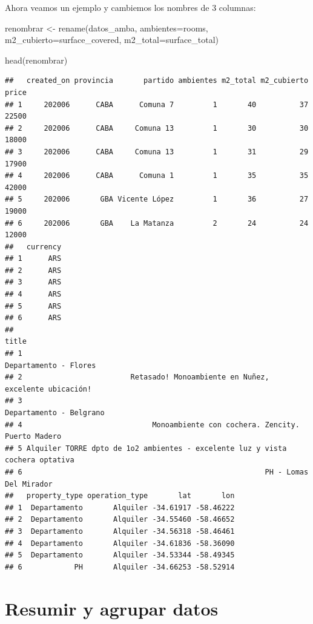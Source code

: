 \documentclass[
  spanish,
]{book}
\newenvironment{Shaded}{\begin{snugshade}}{\end{snugshade}}
\newcommand{\AttributeTok}[1]{\textcolor[rgb]{0.77,0.63,0.00}{#1}}
\newcommand{\FunctionTok}[1]{\textcolor[rgb]{0.00,0.00,0.00}{#1}}
\newcommand{\NormalTok}[1]{#1}
\newcommand{\OtherTok}[1]{\textcolor[rgb]{0.56,0.35,0.01}{#1}}
\begin{document}
Ahora veamos un ejemplo y cambiemos los nombres de 3 columnas:

\begin{Shaded}
\begin{Highlighting}[]
\NormalTok{renombrar }\OtherTok{\textless{}{-}} \FunctionTok{rename}\NormalTok{(datos\_amba, }\AttributeTok{ambientes=}\NormalTok{rooms, }\AttributeTok{m2\_cubierto=}\NormalTok{surface\_covered, }\AttributeTok{m2\_total=}\NormalTok{surface\_total)}

\FunctionTok{head}\NormalTok{(renombrar)}
\end{Highlighting}
\end{Shaded}

\begin{verbatim}
##   created_on provincia       partido ambientes m2_total m2_cubierto price
## 1     202006      CABA      Comuna 7         1       40          37 22500
## 2     202006      CABA     Comuna 13         1       30          30 18000
## 3     202006      CABA     Comuna 13         1       31          29 17900
## 4     202006      CABA      Comuna 1         1       35          35 42000
## 5     202006       GBA Vicente López         1       36          27 19000
## 6     202006       GBA    La Matanza         2       24          24 12000
##   currency
## 1      ARS
## 2      ARS
## 3      ARS
## 4      ARS
## 5      ARS
## 6      ARS
##                                                                           title
## 1                                                         Departamento - Flores
## 2                         Retasado! Monoambiente en Nuñez, excelente ubicación!
## 3                                                       Departamento - Belgrano
## 4                              Monoambiente con cochera. Zencity. Puerto Madero
## 5 Alquiler TORRE dpto de 1o2 ambientes - excelente luz y vista cochera optativa
## 6                                                        PH - Lomas Del Mirador
##   property_type operation_type       lat       lon
## 1  Departamento       Alquiler -34.61917 -58.46222
## 2  Departamento       Alquiler -34.55460 -58.46652
## 3  Departamento       Alquiler -34.56318 -58.46461
## 4  Departamento       Alquiler -34.61836 -58.36090
## 5  Departamento       Alquiler -34.53344 -58.49345
## 6            PH       Alquiler -34.66253 -58.52914
\end{verbatim}

\hypertarget{resumir-y-agrupar-datos}{%
\section{Resumir y agrupar datos}\label{resumir-y-agrupar-datos}}
\end{document}
